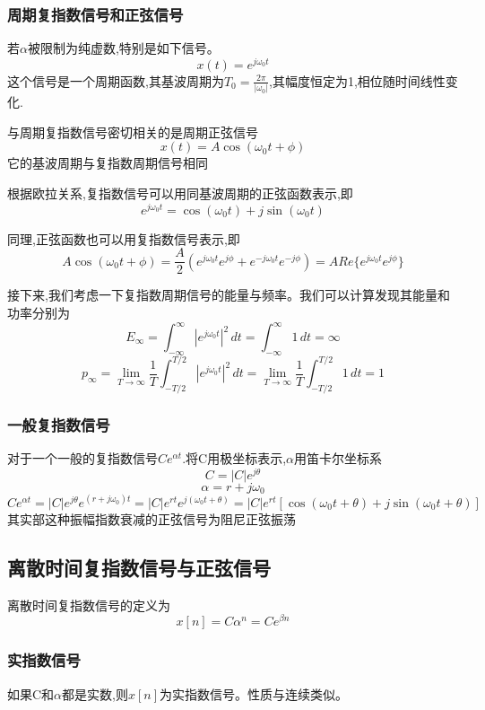 \subsubsection{周期复指数信号和正弦信号}
  若$\alpha$被限制为纯虚数,特别是如下信号。
\[
x(t)=e^{j\omega_0 t}
\]
这个信号是一个周期函数,其基波周期为$T_0=\frac{2\pi}{|\omega_0|}$,其幅度恒定为1,相位随时间线性变化.\par
与周期复指数信号密切相关的是周期正弦信号
\[
x(t)=A\cos(\omega_0 t+\phi)
\]
它的基波周期与复指数周期信号相同\par
根据欧拉关系,复指数信号可以用同基波周期的正弦函数表示,即
\[
e^{j\omega_0 t}=\cos(\omega_0 t)+j\sin(\omega_0 t)
\]\par
同理,正弦函数也可以用复指数信号表示,即
\[
A\cos(\omega_0 t+\phi)=\frac{A}{2}(e^{j\omega_0 t} e^{j\phi}+e^{-j\omega_0 t} e^{-j\phi})=A Re\{e^{j\omega_0 t} e^{j\phi}\}
\]\par
接下来,我们考虑一下复指数周期信号的能量与频率。我们可以计算发现其能量和功率分别为
\begin{equation*}
    E_\infty=\int_{-\infty}^{\infty}|e^{j\omega_0 t}|^2\,dt=\int_{-\infty}^{\infty}1\,dt=\infty
\end{equation*}
\begin{equation*}
     p_\infty=\lim_{T\to\infty}\frac{1}{T}\int_{-T/2}^{T/2}|e^{j\omega_0 t}|^2\,dt=\lim_{T\to\infty}\frac{1}{T}\int_{-T/2}^{T/2}1\,dt=1
\end{equation*}
\subsubsection{一般复指数信号}
对于一个一般的复指数信号$Ce^{\alpha t}$.将C用极坐标表示,$\alpha $用笛卡尔坐标系
\[C=|C|e^{j\theta}\]
\[\alpha=r+j\omega_0\]
\[
Ce^{\alpha t}=|C|e^{j\theta}e^{(r+j\omega_0)t}=|C|e^{rt}e^{j(\omega_0 t+\theta)}=|C|e^{rt}[\cos(\omega_0 t+\theta)+j\sin(\omega_0 t+\theta)]
\]
其实部这种振幅指数衰减的正弦信号为阻尼正弦振荡
\subsection{离散时间复指数信号与正弦信号}
\begin{definition}
    离散时间复指数信号的定义为
    \[
    x[n] =C \alpha^{n}= C e^{\beta n}
    \]
\end{definition}
\subsubsection{实指数信号}\par
如果C和$\alpha$都是实数,则$x[n]$为实指数信号。性质与连续类似。
